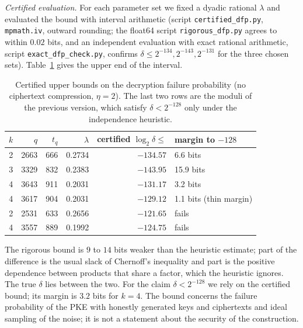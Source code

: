 \documentclass[11pt]{article}
\theoremstyle{remark}
\begin{document}
\emph{Certified evaluation.} For each parameter set we fixed a dyadic rational $\lambda$ and evaluated the bound with interval arithmetic (script \texttt{certified\_dfp.py}, \texttt{mpmath.iv}, outward rounding; the float64 script \texttt{rigorous\_dfp.py} agrees to within $0.02$ bits, and an independent evaluation with exact rational arithmetic, script \texttt{exact\_dfp\_check.py}, confirms $\delta\le2^{-134},2^{-143},2^{-131}$ for the three chosen sets). Table~\ref{tab:cert} gives the upper end of the interval.
\begin{table}[h]\centering\small
\begin{tabular}{rrrrrl}\toprule
$k$ & $q$ & $t_q$ & $\lambda$ & certified $\log_2\delta\le$ & margin to $-128$\\\midrule
2 & 2663 & 666 & 0.2734 & $-134.57$ & 6.6 bits\\
3 & 3329 & 832 & 0.2383 & $-143.95$ & 15.9 bits\\
4 & 3643 & 911 & 0.2031 & $-131.17$ & 3.2 bits\\\midrule
4 & 3617 & 904 & 0.2031 & $-129.12$ & 1.1 bits (thin margin)\\
2 & 2531 & 633 & 0.2656 & $-121.65$ & fails\\
4 & 3557 & 889 & 0.1992 & $-124.75$ & fails\\\bottomrule
\end{tabular}
\caption{Certified upper bounds on the decryption failure probability (no ciphertext compression, $\eta=2$). The last two rows are the moduli of the previous version, which satisfy $\delta<2^{-128}$ only under the independence heuristic.}\label{tab:cert}
\end{table}
The rigorous bound is $9$ to $14$ bits weaker than the heuristic estimate; part of the difference is the usual slack of Chernoff's inequality and part is the positive dependence between products that share a factor, which the heuristic ignores. The true $\delta$ lies between the two. For the claim $\delta<2^{-128}$ we rely on the certified bound; its margin is $3.2$ bits for $k=4$. The bound concerns the failure probability of the PKE with honestly generated keys and ciphertexts and ideal sampling of the noise; it is not a statement about the security of the construction.
\end{document}
